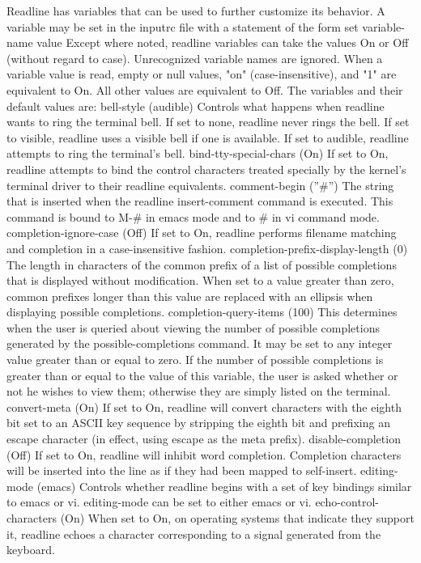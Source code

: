 Readline has variables that can be used to further customize its behavior. A variable may be set in the inputrc file with a statement of the form
set variable-name value
Except where noted, readline variables can take the values On or Off (without regard to case). Unrecognized variable names are ignored. When a variable value is read, empty or null values, "on" (case-insensitive), and "1" are equivalent to On. All other values are equivalent to Off. The variables and their default values are:
bell-style (audible)
Controls what happens when readline wants to ring the terminal bell. If set to none, readline never rings the bell. If set to visible, readline uses a visible bell if one is available. If set to audible, readline attempts to ring the terminal's bell.
bind-tty-special-chars (On)
If set to On, readline attempts to bind the control characters treated specially by the kernel's terminal driver to their readline equivalents.
comment-begin (''\#'')
The string that is inserted when the readline insert-comment command is executed. This command is bound to M-\# in emacs mode and to \# in vi command mode.
completion-ignore-case (Off)
If set to On, readline performs filename matching and completion in a case-insensitive fashion.
completion-prefix-display-length (0)
The length in characters of the common prefix of a list of possible completions that is displayed without modification. When set to a value greater than zero, common prefixes longer than this value are replaced with an ellipsis when displaying possible completions.
completion-query-items (100)
This determines when the user is queried about viewing the number of possible completions generated by the possible-completions command. It may be set to any integer value greater than or equal to zero. If the number of possible completions is greater than or equal to the value of this variable, the user is asked whether or not he wishes to view them; otherwise they are simply listed on the terminal.
convert-meta (On)
If set to On, readline will convert characters with the eighth bit set to an ASCII key sequence by stripping the eighth bit and prefixing an escape character (in effect, using escape as the meta prefix).
disable-completion (Off)
If set to On, readline will inhibit word completion. Completion characters will be inserted into the line as if they had been mapped to self-insert.
editing-mode (emacs)
Controls whether readline begins with a set of key bindings similar to emacs or vi. editing-mode can be set to either emacs or vi.
echo-control-characters (On)
When set to On, on operating systems that indicate they support it, readline echoes a character corresponding to a signal generated from the keyboard.
